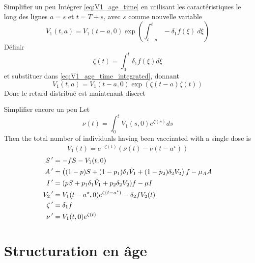 \documentclass[aspectratio=169]{beamer}\usepackage[]{graphicx}\usepackage[]{xcolor}
\begin{document}
\begin{frame}{Simplifier un peu}
Intégrer \eqref{eq:V1_age_time} en utilisant les caractéristiques le long des lignes $a=s$ et $t=T+s$, avec $s$ comme nouvelle variable
\begin{equation}\label{eq:V1_age_time_integrated}
V_1(t,a)=V_1(t-a,0)\exp\left(\int_{t-a}^t -\delta_1f(\xi)\ d\xi\right)
\end{equation}
Définir
\[
\zeta(t)=\int_0^t\delta_1f(\xi)d\xi
\]
et substituer dans \eqref{eq:V1_age_time_integrated}, donnant
\[
V_1(t,a)=V_1(t-a,0)\exp\left(\zeta(t-a)\zeta(t)\right)
\]
Donc le retard distribué est maintenant discret
\end{frame}

\begin{frame}{Simplifier encore un peu}
Let
\[
\nu(t)=\int_0^t V_1(s,0)e^{\zeta(s)}ds
\]
Then the total number of individuals having been vaccinated with a single dose is
\[
\tilde V_1(t)=e^{-\zeta(t)}
\left(
\nu(t)-\nu(t-a^\star)
\right)
\]
\begin{subequations}
\begin{align}
S\,' &= -fS-V_1(t,0) \\
A\,' &= \left(
(1-p)S+(1-p_1)\delta_1\tilde V_1+(1-p_2)\delta_2 V_2
\right)f-\mu_AA \\
I\,' &= (pS+p_1\delta_1\tilde V_1+p_2\delta_2 V_2)f-\mu I \\
V_2\,' &= V_1(t-a^\star,0)e^{\zeta(t-a^\star)}-\delta_2fV_2(t) \\
\zeta\,' &= \delta_1f \\
\nu\,' &= V_1(t,0)e^{\zeta(t)}
\end{align}
\end{subequations}
\end{frame}


\section{Structuration en âge}

% 
\end{document}
